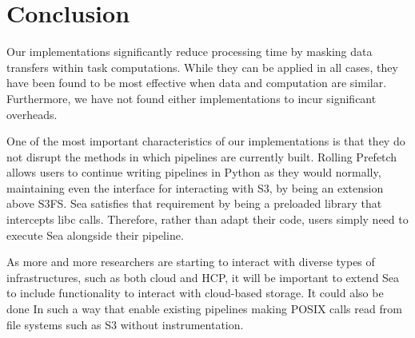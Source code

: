 \chapter{Conclusion}

Our implementations significantly reduce processing time by masking data transfers within task computations.
While they can be applied in all cases, they have been found to be most effective when data and computation are
similar. Furthermore, we have not found either implementations to incur significant overheads.

One of the most important characteristics of our implementations is that they do not disrupt the methods in which pipelines
are currently built. Rolling Prefetch allows users to continue writing pipelines in Python as they would normally, maintaining
even the interface for interacting with S3, by being an extension above S3FS. Sea satisfies that requirement by being a preloaded
library that intercepts libc calls. Therefore, rather than adapt their code, users simply need to execute Sea alongside their pipeline.

As more and more researchers are starting to interact with diverse types of infrastructures, such as both cloud and HCP,
it will be important to extend Sea to include functionality to interact with cloud-based storage. It could also be done In
such a way that enable existing pipelines making POSIX calls read from file systems such as 
S3 without instrumentation.



